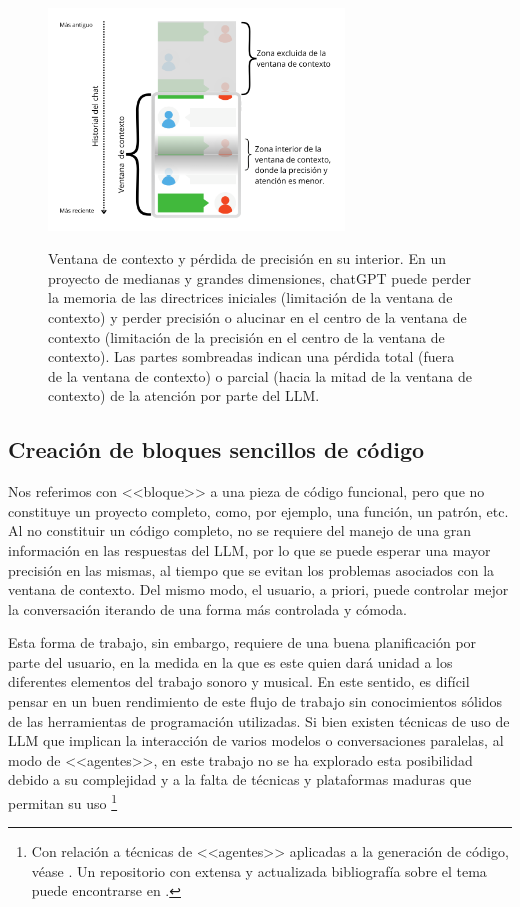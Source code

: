 \begin{figure}[h!]
    \caption[Ventana de contexto y pérdida de precisión en su interior]{Ventana de contexto y pérdida de precisión en su interior. En un proyecto de medianas y grandes dimensiones, chatGPT puede perder la memoria de las directrices iniciales (limitación de la ventana de contexto) y perder precisión o alucinar en el centro de la ventana de contexto (limitación de la precisión en el centro de la ventana de contexto). Las partes sombreadas indican una pérdida total (fuera de la ventana de contexto) o parcial (hacia la mitad de la ventana de contexto) de la atención por parte del LLM.}
    \centering
    \includegraphics[width=0.7\textwidth]{./figuras/chat_ventana_lost_in_the_middle.png}
    \label{fig:chat_ventana_lost_in_the_middle}
\end{figure}


\subsection{Creación de bloques sencillos de código}

Nos referimos con <<bloque>> a una pieza de código funcional, pero que no constituye un proyecto completo, como, por ejemplo, una función, un patrón, etc. Al no constituir un código completo, no se requiere del manejo de una gran información en las respuestas del LLM, por lo que se puede esperar una mayor precisión en las mismas, al tiempo que se evitan los problemas asociados con la ventana de contexto. Del mismo modo, el usuario, a priori, puede controlar mejor la conversación iterando de una forma más controlada y cómoda. 

Esta forma de trabajo, sin embargo, requiere de una buena planificación por parte del usuario, en la medida en la que es este quien dará unidad a los diferentes elementos del trabajo sonoro y musical. En este sentido, es difícil pensar en un buen rendimiento de este flujo de trabajo sin conocimientos sólidos de las herramientas de programación utilizadas. Si bien existen técnicas de uso de LLM que implican la interacción de varios modelos o conversaciones paralelas, al modo de <<agentes>>, en este trabajo no se ha explorado esta posibilidad debido a su complejidad y a la falta de técnicas y plataformas maduras que permitan su uso \footnote{Con relación a técnicas de <<agentes>> aplicadas a la generación de código, véase \cite{huangAgentCoderMultiAgentbasedCode2023}. Un repositorio con extensa y actualizada bibliografía sobre el tema puede encontrarse en \cite{AGIEdgerunnersLLMAgentsPapers2024}.}

